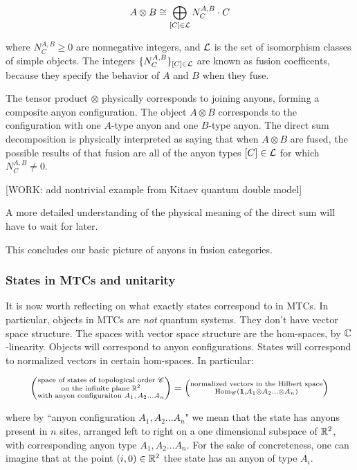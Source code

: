 $$A\otimes B \cong \bigoplus_{[C]\in \mathcal{L}}N^{A,B}_{C}\cdot C$$

where $N^{A,B}_{C}\geq 0$ are nonnegative integers, and $\mathcal{L}$ is the set of isomorphism classes of simple objects. The integers $\{N^{A,B}_C\}_{[C]\in \mathcal{L}}$ are known as fusion coefficents, because they specify the behavior of $A$ and $B$ when they fuse.

The tensor product $\otimes$ physically corresponds to joining anyons, forming a composite anyon configuration. The object $A\otimes B$ corresponds to the configuration with one $A$-type anyon and one $B$-type anyon. The direct sum decomposition is physically interpreted as saying that when $A\otimes B$ are fused, the possible results of that fusion are all of the anyon types $[C]\in \mathcal{L}$ for which $N^{A,B}_{C}\neq 0$.

[WORK: add nontrivial example from Kitaev quantum double model]

A more detailed understanding of the physical meaning of the direct sum will have to wait for later.

This concludes our basic picture of anyons in fusion categories.

\subsubsection{States in MTCs and unitarity}

It is now worth reflecting on what exactly states correspond to in MTCs. In particular, objects in MTCs are \textit{not} quantum systems. They don't have vector space structure. The spaces with vector space structure are the hom-spaces, by $\mathbb{C}$-linearity. Objects will correspond to anyon configurations. States will correspond to normalized vectors in certain hom-spaces. In particular:

\begin{equation*}
\left(\substack{\text{space of states of topological order $\mathscr{C}$} \\ \text{on the infinite plane $\mathbb{R}^2$} \\ \text{with anyon configuraiton $A_1,A_2...A _n$}}\right)
=
\left(
\substack{
\text{normalized vectors in the Hilbert space}\\
\operatorname{Hom}_{\mathscr{C}}(\mathbf{1}, A_1\otimes A_2... \otimes A_n)
}
\right)
\end{equation*}

where by ``anyon configuration $A_1,A_2...A_n$" we mean that the state has anyons present in $n$ sites, arranged left to right on a one dimensional subspace of $\mathbb{R}^2$, with corresponding anyon type $A_1,A_2...A_n$. For the sake of concreteness, one can imagine that at the point $(i,0)\in \mathbb{R}^2$ thee state has an anyon of type $A_i$.

